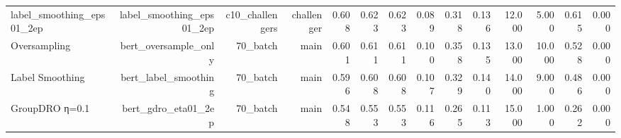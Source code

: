 \begin{tabular}{lrrrrrrrrrrrrr}
label\_smoothing\_eps01\_2ep & label\_smoothing\_eps01\_2ep & c10\_challengers & challenger & 0.608 & 0.623 & 0.623 & 0.089 & 0.318 & 0.136 & 12.000 & 5.000 & 0.615 & 0.000 \\
Oversampling & bert\_oversample\_only & 70\_batch & main & 0.601 & 0.611 & 0.611 & 0.100 & 0.358 & 0.135 & 13.000 & 10.000 & 0.528 & 0.000 \\
Label Smoothing & bert\_label\_smoothing & 70\_batch & main & 0.596 & 0.608 & 0.608 & 0.107 & 0.329 & 0.140 & 14.000 & 9.000 & 0.486 & 0.000 \\
GroupDRO η=0.1 & bert\_gdro\_eta01\_2ep & 70\_batch & main & 0.548 & 0.553 & 0.553 & 0.116 & 0.265 & 0.113 & 15.000 & 1.000 & 0.262 & 0.000 \\
\bottomrule
\end{tabular}
